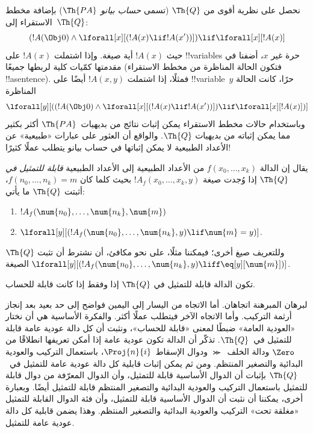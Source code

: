 \documentclass[../../../include/open-logic-section]{subfiles}
\begin{document}
نحصل على نظرية أقوى من $\Th{Q}$ (تسمى \emph{حساب بيانو} $\Th{PA}$)
بإضافة مخطط الاستقراء إلى~$\Th{Q}$:
\[
(!A(\Obj 0) \land \lforall[x][(!A(x) \lif !A(x'))]) \lif \lforall[x][!A(x)]
\]
حيث $!A(x)$ أية صيغة. وإذا اشتملت $!A(x)$ على !!{variable}s حرة غير
$x$، أضفنا في مقدمتها كمّيات كلية لربطها جميعًا (فتكون الحالة المناظرة
من مخطط الاستقراء !!a{sentence}). فمثلًا، إذا اشتملت $!A(x,y)$ أيضًا
على !!{variable}~$y$ حرًا، كانت الحالة المناظرة
\[
\lforall[y][((!A(\Obj 0) \land \lforall[x][(!A(x) \lif !A(x'))]) \lif
  \lforall[x][!A(x)])]
\]
وباستخدام حالات مخطط الاستقراء يمكن إثبات نتائج من بديهيات~$\Th{PA}$
أكثر بكثير مما يمكن إثباته من بديهيات $\Th{Q}$. والواقع أن العثور على
عبارات «طبيعية» عن الأعداد الطبيعية لا يمكن إثباتها في حساب بيانو
يتطلب عملًا كثيرًا!{}

\begin{defn}
  يقال إن الدالة $f(x_0,\ldots,x_k)$ من الأعداد الطبيعية إلى الأعداد
  الطبيعية {\em قابلة للتمثيل في $\Th{Q}$} إذا وُجدت صيغة
  $!A_f(x_0,\dots,x_k,y)$ بحيث كلما كان $f(n_0,\dots,n_k)=m$، أثبتت
  $\Th{Q}$ ما يأتي:
\begin{enumerate}
\item{} $!A_f(\num{n_0}, \dots, \num{n_k}, \num{m})$
\item{} $\lforall[y][(!A_f(\num{n_0}, \dots,
\num{n_k}, y) \lif \num{m} = y)]$.
\end{enumerate}
\end{defn}

وللتعريف صيغ أخرى؛ فيمكننا مثلًا، على نحو مكافئ، أن نشترط أن تثبت
$\Th{Q}$ الصيغة
$\lforall[y][(!A_f(\num{n_0},\dots,\num{n_k},y)\liff\eq[y][\num{m}])]$.

\begin{thm}
تكون الدالة قابلة للتمثيل في $\Th{Q}$ إذا وفقط إذا كانت قابلة للحساب.
\end{thm}

لبرهان المبرهنة اتجاهان. أما الاتجاه من اليسار إلى اليمين فواضح إلى حد
بعيد بعد إنجاز أرثمة التركيب. وأما الاتجاه الآخر فيتطلب عملًا أكثر.
والفكرة الأساسية هي أن نختار «العودية العامة» ضبطًا لمعنى «قابلة
للحساب»، ونثبت أن كل دالة عودية عامة قابلة للتمثيل في~$\Th{Q}$. تذكّر
أن الدالة تكون عودية عامة إذا أمكن تعريفها انطلاقًا من $\Zero$ ودالة
الخلف~$\Succ$ ودوال الإسقاط~$\Proj{n}{i}$، باستعمال التركيب والعودية
البدائية والتصغير المنتظم. ومن ثم يمكن إثبات قابلية كل دالة عودية
عامة للتمثيل في~$\Th{Q}$ بإثبات أن الدوال الأساسية قابلة للتمثيل، وأن
الدوال المعرّفة من دوال قابلة للتمثيل باستعمال التركيب والعودية
البدائية والتصغير المنتظم قابلة للتمثيل أيضًا. وبعبارة أخرى، يمكننا
أن نثبت أن الدوال الأساسية قابلة للتمثيل، وأن فئة الدوال القابلة
للتمثيل «مغلقة تحت» التركيب والعودية البدائية والتصغير المنتظم. وهذا
يضمن قابلية كل دالة عودية عامة للتمثيل.
\end{document}
